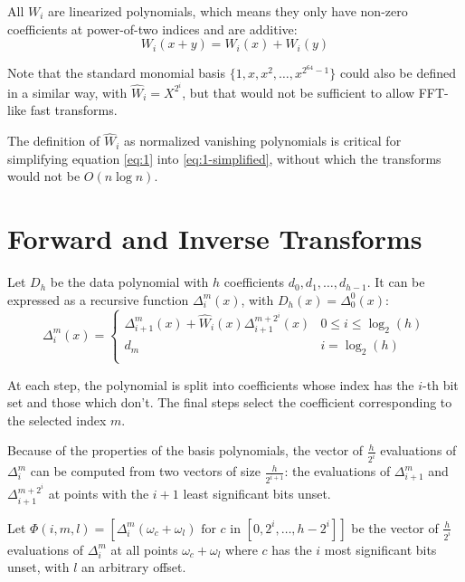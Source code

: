 All $W_i$ are linearized polynomials, which means they only have non-zero coefficients at power-of-two indices and are additive:
\begin{equation}W_i(x + y) = W_i(x) + W_i(y)\end{equation}

Note that the standard monomial basis $\{1, x, x^2, \ldots, x^{2^{64} - 1}\}$ could also be defined in a similar way, with $\hat{W}_i = X^{2^{i}}$, but that would not be sufficient to allow FFT-like fast transforms.

The definition of $\hat{W}_i$ as normalized vanishing polynomials is critical for simplifying equation \ref{eq:1} into \ref{eq:1-simplified}, without which the transforms would not be $O(n \log n)$.

\section{Forward and Inverse Transforms}

Let $D_h$ be the data polynomial with $h$ coefficients $d_0, d_1, \ldots, d_{h - 1}$. It can be expressed as a recursive function $\Delta_i^m(x)$, with $D_h(x) = \Delta_0^0(x)$:
\begin{equation}
\Delta_i^m(x) = \begin{cases}
    \Delta_{i+1}^m(x) + \hat{W}_i(x) \Delta_{i+1}^{m+2^i}(x) & 0 \leq i \le \log_2(h) \\
    d_m & i = \log_2(h) \\
    \end{cases}
\end{equation}

At each step, the polynomial is split into coefficients whose index has the $i$-th bit set and those which don't. The final steps select the coefficient corresponding to the selected index $m$.

Because of the properties of the basis polynomials, the vector of $\frac{h}{2^i}$ evaluations of $\Delta_i^m$ can be computed from two vectors of size $\frac{h}{2^{i + 1}}$: the evaluations of $\Delta_{i+1}^m$ and $\Delta_{i+1}^{m + 2^i}$ at points with the $i + 1$ least significant bits unset.

Let $\Phi(i, m, l) = [\Delta_i^m(\omega_c + \omega_l) \text{ for } c \text{ in } [0, 2^i, \ldots, h - 2^i]]$ be the vector of $\frac{h}{2^i}$ evaluations of $\Delta_i^m$ at all points $\omega_c + \omega_l$ where $c$ has the $i$ most significant bits unset, with $l$ an arbitrary offset.


